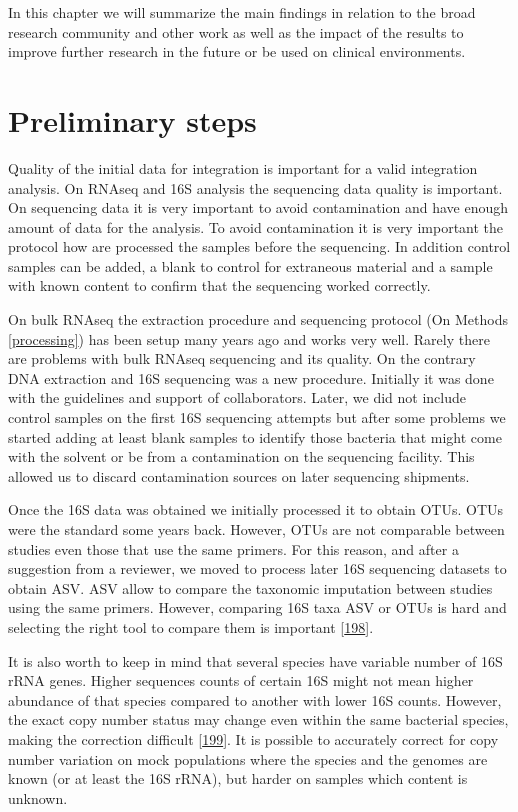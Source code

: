 \documentclass[
  a4paper,
]{book}
\begin{document}
In this chapter we will summarize the main findings in relation to the broad research community and other work as well as the impact of the results to improve further research in the future or be used on clinical environments.

\hypertarget{preliminary-steps}{%
\section{Preliminary steps}\label{preliminary-steps}}

Quality of the initial data for integration is important for a valid integration analysis.
On RNAseq and 16S analysis the sequencing data quality is important.
On sequencing data it is very important to avoid contamination and have enough amount of data for the analysis.
To avoid contamination it is very important the protocol how are processed the samples before the sequencing.
In addition control samples can be added, a blank to control for extraneous material and a sample with known content to confirm that the sequencing worked correctly.

On bulk RNAseq the extraction procedure and sequencing protocol (On Methods \ref{processing}) has been setup many years ago and works very well.
Rarely there are problems with bulk RNAseq sequencing and its quality.
On the contrary DNA extraction and 16S sequencing was a new procedure.
Initially it was done with the guidelines and support of collaborators.
Later, we did not include control samples on the first 16S sequencing attempts but after some problems we started adding at least blank samples to identify those bacteria that might come with the solvent or be from a contamination on the sequencing facility.
This allowed us to discard contamination sources on later sequencing shipments.

Once the 16S data was obtained we initially processed it to obtain OTUs.
OTUs were the standard some years back.
However, OTUs are not comparable between studies even those that use the same primers.
For this reason, and after a suggestion from a reviewer, we moved to process later 16S sequencing datasets to obtain ASV.
ASV allow to compare the taxonomic imputation between studies using the same primers.
However, comparing 16S taxa ASV or OTUs is hard and selecting the right tool to compare them is important {[}\protect\hyperlink{ref-nearing2022}{198}{]}.

It is also worth to keep in mind that several species have variable number of 16S rRNA genes.
Higher sequences counts of certain 16S might not mean higher abundance of that species compared to another with lower 16S counts.
However, the exact copy number status may change even within the same bacterial species, making the correction difficult {[}\protect\hyperlink{ref-louca2018}{199}{]}.
It is possible to accurately correct for copy number variation on mock populations where the species and the genomes are known (or at least the 16S rRNA), but harder on samples which content is unknown.
\end{document}
